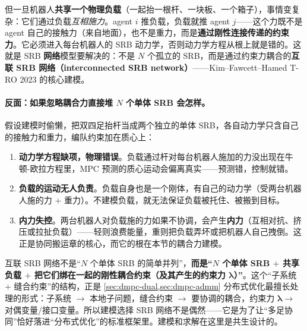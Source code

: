 但一旦机器人\textbf{共享一个物理负载}（一起抬一根杆、一块板、一个箱子），事情变复杂：它们通过负载\emph{互相施力}。agent $i$ 推负载，负载就推 agent $j$——这个力既不是 agent 自己的接触力（来自地面），也不是重力，而是\textbf{通过刚性连接传递的约束力}。它必须进入每台机器人的 SRB 动力学，否则动力学方程从根上就是错的。这就是 SRB \textbf{网络}模型要解决的：不是 $N$ 个孤立的 SRB，而是通过约束力耦合的\textbf{互联 SRB 网络（interconnected SRB network）}——Kim--Fawcett--Hamed T-RO 2023\cite{kim2023layered} 的核心建模。

\paragraph{反面：如果忽略耦合力直接堆 $N$ 个单体 SRB 会怎样。}
假设建模时偷懒，把双四足抬杆当成两个独立的单体 SRB，各自动力学只含自己的接触力和重力，编队约束加在质心上：
\begin{enumerate}
  \item \textbf{动力学方程缺项，物理错误}。负载通过杆对每台机器人施加的力没出现在牛顿-欧拉方程里，MPC 预测的质心运动会偏离真实——预测错，控制就错。
  \item \textbf{负载的运动无人负责}。负载自身也是一个刚体，有自己的动力学（受两台机器人施的力 $+$ 重力）。不建模负载，就无法保证负载被托住、被搬到目标。
  \item \textbf{内力失控}。两台机器人对负载施的力如果不协调，会产生\textbf{内力}（互相对抗、挤压或拉扯负载）——轻则浪费能量，重则把负载弄坏或把机器人自己拽倒。这正是协同搬运章的核心，而它的根在本节的耦合力建模。
\end{enumerate}

\begin{insight}[SRB 网络 $=$ 子系统 $+$ 缝合约束]\label{ins:dmpc-srb-stitch}
互联 SRB 网络不是“$N$ 个单体 SRB 的简单并列”，\textbf{而是“$N$ 个单体 SRB $+$ 共享负载 $+$ 把它们绑在一起的刚性耦合约束（及其产生的约束力 $\boldsymbol{\lambda}$）”}。这个“子系统 $+$ 缝合约束”的结构，正是 \cref{sec:dmpc-dual,sec:dmpc-admm} 分布式优化最擅长处理的形式：子系统 $\to$ 本地子问题，缝合约束 $\to$ 要协调的耦合，约束力 $\boldsymbol{\lambda}\to$ 对偶变量/接口变量。所以建模选择 SRB 网络不是偶然——它是为了让“多足协同”恰好落进“分布式优化”的标准框架里。建模和求解在这里是共生设计的。
\end{insight}

